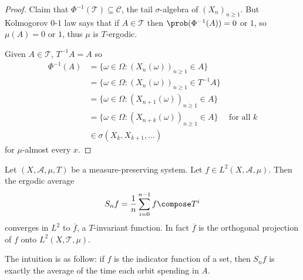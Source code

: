 \documentclass[a4paper]{article}
\renewcommand{\P}{\prob} %
\begin{document}
\begin{proof}
  Claim that \(\Phi^{-1}(\mathcal T) \subseteq \mathcal C\), the tail \(\sigma\)-algebra of \((X_n)_{n \geq 1}\). But Kolmogorov \(0\)-\(1\) law says that if \(A \in \mathcal T\) then \(\P(\Phi^{-1}(A)) = 0\) or \(1\), so \(\mu(A) = 0\) or \(1\), thus \(\mu\) is \(T\)-ergodic.

  Given \(A \in \mathcal T\), \(T^{-1}A = A\) so
  \begin{align*}
    \Phi^{-1}(A)
    &= \{\omega \in \Omega: (X_n(\omega))_{n \geq 1} \in A\} \\
    &= \{\omega \in \Omega: (X_n(\omega))_{n \geq 1} \in T^{-1}A\} \\
    &= \{\omega \in \Omega: (X_{n + 1}(\omega))_{n \geq 1} \in A\} \\
    &= \{\omega \in \Omega: (X_{n + k}(\omega))_{n \geq 1} \in A\} \quad \text{ for all } k \\
    &\in \sigma(X_k, X_{k + 1}, \dots)
  \end{align*}
  for \(\mu\)-almost every \(x\).
\end{proof}

\begin{theorem}
  Let \((X, \mathcal A, \mu, T)\) be a measure-preserving system. Let \(f \in L^2(X, \mathcal A, \mu)\). Then the ergodic average
  \[
    S_nf = \frac{1}{n} \sum_{i = 0}^{n - 1} f \compose T^i
  \]
  converges in \(L^2\) to \(\overline f\), a \(T\)-invariant function. In fact \(\overline f\) is the orthogonal projection of \(f\) onto \(L^2(X, \mathcal T, \mu)\).
\end{theorem}

The intuition is as follow: if \(f\) is the indicator function of a set, then \(S_nf\) is exactly the average of the time each orbit spending in \(A\).
\end{document}
